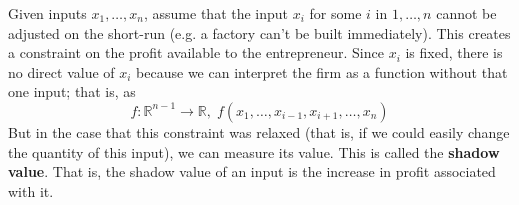 \documentclass{article}
\begin{document}
      \begin{definition}
        \label{def:shadow-value}
        Given inputs $x_1, \ldots, x_n$, assume that the input $x_i$ for some $i$ in $1, \ldots, n$ cannot be adjusted on the short-run (e.g. a factory can't be built immediately). This creates a constraint on the profit available to the entrepreneur. Since $x_i$ is fixed, there is no direct value of $x_i$ because we can interpret the firm as a function without that one input; that is, as 
        \begin{equation}
          f: \mathbb{R}^{n-1} \to \mathbb{R}, \; f(x_1, \ldots, x_{i-1}, x_{i+1}, \ldots, x_n)
        \end{equation}
        But in the case that this constraint was relaxed (that is, if we could easily change the quantity of this input), we can measure its value. This is called the \textbf{shadow value}. That is, the shadow value of an input is the increase in profit associated with it. 
      \end{definition}
\end{document}
